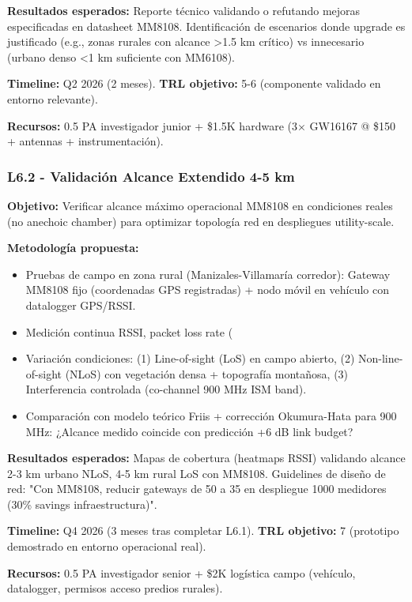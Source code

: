 \textbf{Resultados esperados:} Reporte técnico validando o refutando mejoras especificadas en datasheet MM8108. Identificación de escenarios donde upgrade es justificado (e.g., zonas rurales con alcance >1.5 km crítico) vs innecesario (urbano denso <1 km suficiente con MM6108).

\textbf{Timeline:} Q2 2026 (2 meses). \textbf{TRL objetivo:} 5-6 (componente validado en entorno relevante).

\textbf{Recursos:} 0.5 PA investigador junior + \$1.5K hardware (3$\times$ GW16167 @ \$150 + antennas + instrumentación).

\subsubsection{L6.2 - Validación Alcance Extendido 4-5 km}

\textbf{Objetivo:} Verificar alcance máximo operacional MM8108 en condiciones reales (no anechoic chamber) para optimizar topología red en despliegues utility-scale.

\textbf{Metodología propuesta:}
\begin{itemize}
    \item Pruebas de campo en zona rural (Manizales-Villamaría corredor): Gateway MM8108 fijo (coordenadas GPS registradas) + nodo móvil en vehículo con datalogger GPS/RSSI.
    \item Medición continua RSSI, packet loss rate (%
    \item Variación condiciones: (1) Line-of-sight (LoS) en campo abierto, (2) Non-line-of-sight (NLoS) con vegetación densa + topografía montañosa, (3) Interferencia controlada (co-channel 900 MHz ISM band).
    \item Comparación con modelo teórico Friis + corrección Okumura-Hata para 900 MHz: ¿Alcance medido coincide con predicción +6 dB link budget?
\end{itemize}

\textbf{Resultados esperados:} Mapas de cobertura (heatmaps RSSI) validando alcance 2-3 km urbano NLoS, 4-5 km rural LoS con MM8108. Guidelines de diseño de red: "Con MM8108, reducir gateways de 50 a 35 en despliegue 1000 medidores (30\% savings infraestructura)".

\textbf{Timeline:} Q4 2026 (3 meses tras completar L6.1). \textbf{TRL objetivo:} 7 (prototipo demostrado en entorno operacional real).

\textbf{Recursos:} 0.5 PA investigador senior + \$2K logística campo (vehículo, datalogger, permisos acceso predios rurales).

